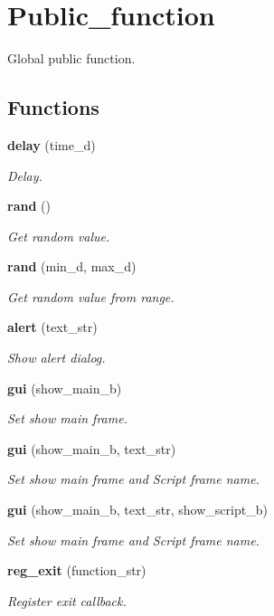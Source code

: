 \section{Public\+\_\+function}
\label{group___public__function}


Global public function.  


\subsection*{Functions}
\begin{DoxyCompactItemize}
\item 
\textbf{ delay} (time\+\_\+d)
\begin{DoxyCompactList}\small\item\em Delay. \end{DoxyCompactList}\item 
\textbf{ rand} ()
\begin{DoxyCompactList}\small\item\em Get random value. \end{DoxyCompactList}\item 
\textbf{ rand} (min\+\_\+d, max\+\_\+d)
\begin{DoxyCompactList}\small\item\em Get random value from range. \end{DoxyCompactList}\item 
\textbf{ alert} (text\+\_\+str)
\begin{DoxyCompactList}\small\item\em Show alert dialog. \end{DoxyCompactList}\item 
\textbf{ gui} (show\+\_\+main\+\_\+b)
\begin{DoxyCompactList}\small\item\em Set show main frame. \end{DoxyCompactList}\item 
\textbf{ gui} (show\+\_\+main\+\_\+b, text\+\_\+str)
\begin{DoxyCompactList}\small\item\em Set show main frame and Script frame name. \end{DoxyCompactList}\item 
\textbf{ gui} (show\+\_\+main\+\_\+b, text\+\_\+str, show\+\_\+script\+\_\+b)
\begin{DoxyCompactList}\small\item\em Set show main frame and Script frame name. \end{DoxyCompactList}\item 
\textbf{ reg\+\_\+exit} (function\+\_\+str)
\begin{DoxyCompactList}\small\item\em Register exit callback. \end{DoxyCompactList}\end{DoxyCompactItemize}


